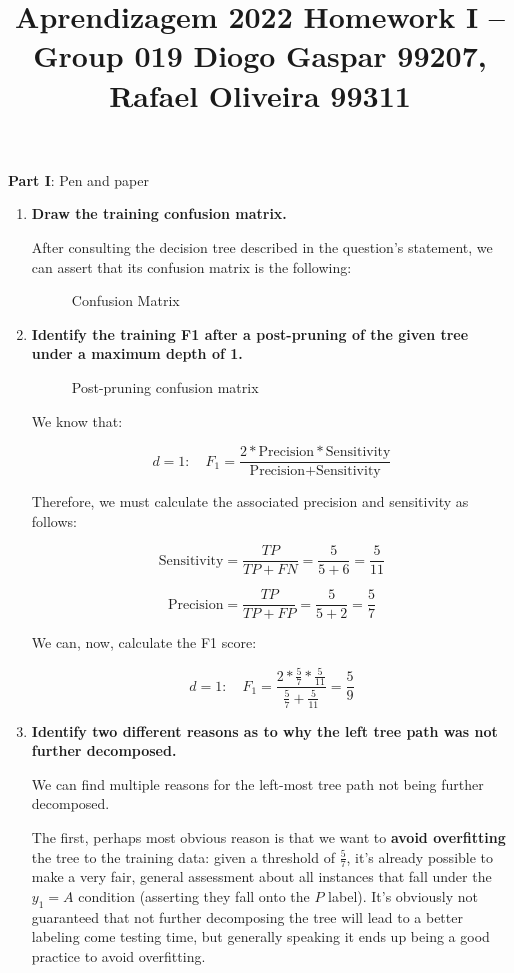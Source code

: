 \documentclass[12pt]{article}
\title{\large{Aprendizagem 2022}\vskip 0.2cm Homework I -- Group 019\vskip 0.2cm Diogo Gaspar 99207, Rafael Oliveira 99311}
\date{}
\begin{document}
\maketitle
\center\large{\vskip -2.5cm\textbf{Part I}: Pen and paper}
\begin{enumerate}[leftmargin=\labelsep]
\item \textbf{Draw the training confusion matrix.}

After consulting the decision tree described in the question's statement,
we can assert that its confusion matrix is the following:

\begin{figure}[htpb]
  \centering
  
  \caption{Confusion Matrix}
\end{figure}

\item \textbf{Identify the training F1 after a post-pruning of the given tree under a maximum depth of 1.}

\begin{figure}[htpb]
\centering

\caption{Post-pruning confusion matrix}
\end{figure}

We know that:

$$
d = 1: \quad F_1 = \frac{2 * \text{Precision} * \text{Sensitivity}}{\text{Precision} + \text{Sensitivity}}
$$

Therefore, we must calculate the associated precision and sensitivity as follows:

$$
\text{Sensitivity} = \frac{TP}{TP + FN} = \frac{5}{5 + 6} = \frac{5}{11}
$$

$$
\text{Precision} = \frac{TP}{TP + FP}= \frac{5}{5 + 2} = \frac{5}{7}
$$

We can, now, calculate the F1 score:

$$
d = 1: \quad F_1 = \frac{2 * \frac{5}{7} * \frac{5}{11}}{\frac{5}{7} + \frac{5}{11}} = \frac{5}{9}
$$

\item \textbf{Identify two different reasons as to why the left tree path was not further decomposed.}

We can find multiple reasons for the left-most tree path not being further decomposed.

The first, perhaps most obvious reason is that we want to \textbf{avoid overfitting} the
tree to the training data: given a threshold of $\frac{5}{7}$, it's already possible
to make a very fair, general assessment about all instances that fall under the $y_1 = A$
condition (asserting they fall onto the $P$ label). It's obviously not guaranteed
that not further decomposing the tree will lead to a better labeling come testing time,
but generally speaking it ends up being a good practice to avoid overfitting.


\end{enumerate}
\end{document}
